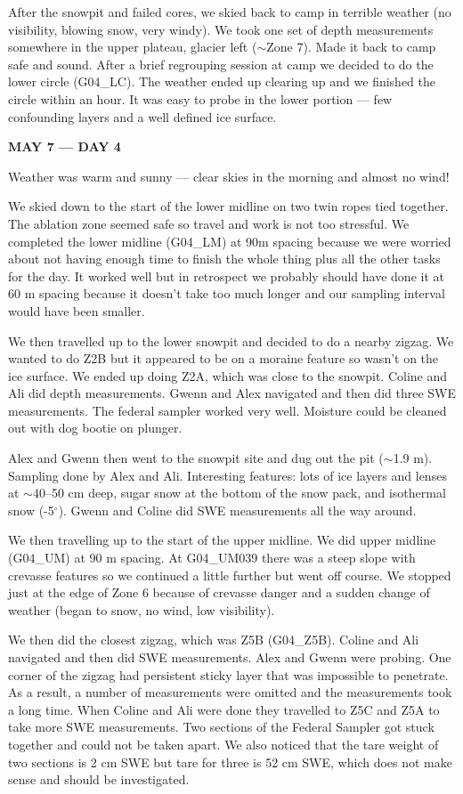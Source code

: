 \documentclass[12pt]{article}
\begin{document}
After the snowpit and failed cores, we skied back to camp in terrible weather (no visibility, blowing snow, very windy). We took one set of depth measurements somewhere in the upper plateau, glacier left ($\sim$Zone 7). Made it back to camp safe and sound. After a brief regrouping session at camp we decided to do the lower circle (G04\_LC).  The weather ended up clearing up and we finished the circle within an hour. It was easy to probe in the lower portion --- few confounding layers and a well defined ice surface. 


\vspace{4mm}
\noindent \textbf{MAY 7 --- DAY 4}

Weather was warm and sunny --- clear skies in the morning and almost no wind! 

We skied down to the start of the lower midline on two twin ropes tied together. The ablation zone seemed safe so travel and work is not too stressful. We completed the lower midline (G04\_LM) at 90m spacing because we were worried about not having enough time to finish the whole thing plus all the other tasks for the day. It worked well but in retrospect we probably should have done it at 60 m spacing because it doesn't take too much longer and our sampling interval would have been smaller. 

We then travelled up to the lower snowpit and decided to do a nearby zigzag. We wanted to do Z2B but it appeared to be on a moraine feature so wasn't on the ice surface. We ended up doing Z2A, which was close to the snowpit. Coline and Ali did depth measurements. Gwenn and Alex navigated and then did three SWE measurements. The federal sampler worked very well. Moisture could be cleaned out with dog bootie on plunger. 

Alex and Gwenn then went to the snowpit site and dug out the pit ($\sim$1.9 m). Sampling done by Alex and Ali. Interesting features: lots of ice layers and lenses at $\sim$40--50 cm deep, sugar snow at the bottom of the snow pack, and isothermal snow (-5$^\circ$). Gwenn and Coline did SWE measurements all the way around.

We then travelling up to the start of the upper midline. We did upper midline (G04\_UM) at 90 m spacing. At G04\_UM039 there was a steep slope with crevasse features so we continued a little further but went off course. We stopped just at the edge of Zone 6 because of crevasse danger and a sudden change of weather (began to snow, no wind, low visibility). 

We then did the closest zigzag, which was Z5B (G04\_Z5B). Coline and Ali navigated and then did SWE measurements. Alex and Gwenn were probing. One corner of the zigzag had persistent sticky layer that was impossible to penetrate. As a result, a number of measurements were omitted and the measurements took a long time. When Coline and Ali were done they travelled to Z5C and Z5A to take more SWE measurements. Two sections of the Federal Sampler got stuck together and could not be taken apart. We also noticed that the tare weight of two sections is 2 cm SWE but tare for three is 52 cm SWE, which does not make sense and should be investigated.
\end{document}
